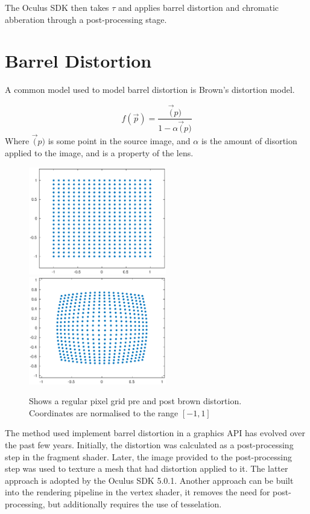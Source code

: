 \documentclass[12pt,a4paper,twoside,openright]{report}
\begin{document}
The Oculus SDK then takes $\tau$ and applies barrel distortion and chromatic abberation through a post-processing stage. 

\section{Barrel Distortion}

A common model used to model barrel distortion is Brown's distortion model. 

\[
f(\vec p) = \frac{\vec(p)}{1-\alpha\vec(p)}
\]
Where $\vec(p)$ is some point in the source image, and $\alpha$ is the amount of disortion applied to the image, and is a property of the lens.


\begin{figure}[tbh]
\begin{center}
\includegraphics[width=6cm]{figs/pre_distortion.eps}
\includegraphics[width=6cm]{figs/post_distortion.eps}
\caption{Shows a regular pixel grid pre and post brown distortion. Coordinates are normalised to the range $[-1,1]$}
\label{epsfig1}
\end{center}
\end{figure}

The method used implement barrel distortion in a graphics API has evolved over the past few years. Initially, the distortion was calculated as a post-processing step in the fragment shader. Later, the image provided to the post-processing step was used to texture a mesh that had distortion applied to it. The latter approach is adopted by the Oculus SDK 5.0.1. Another approach can be built into the rendering pipeline in the vertex shader, it removes the need for post-processing, but additionally requires the use of tesselation.
\end{document}
